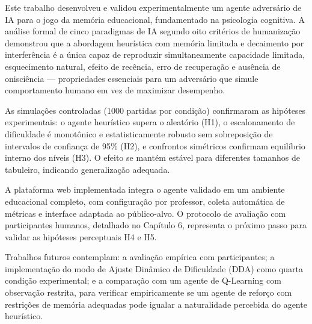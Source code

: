\documentclass[
    12pt,
    openright,
    twoside,
    a4paper,
    english,
    brazil
]{abntex2}
\begin{document}
Este trabalho desenvolveu e validou experimentalmente um agente adversário de IA para o jogo da memória educacional, fundamentado na psicologia cognitiva. A análise formal de cinco paradigmas de IA segundo oito critérios de humanização demonstrou que a abordagem heurística com memória limitada e decaimento por interferência é a única capaz de reproduzir simultaneamente capacidade limitada, esquecimento natural, efeito de recência, erro de recuperação e ausência de onisciência — propriedades essenciais para um adversário que simule comportamento humano em vez de maximizar desempenho.

As simulações controladas (1000 partidas por condição) confirmaram as hipóteses experimentais: o agente heurístico supera o aleatório (H1), o escalonamento de dificuldade é monotônico e estatisticamente robusto sem sobreposição de intervalos de confiança de 95\% (H2), e confrontos simétricos confirmam equilíbrio interno dos níveis (H3). O efeito se mantém estável para diferentes tamanhos de tabuleiro, indicando generalização adequada.

A plataforma web implementada integra o agente validado em um ambiente educacional completo, com configuração por professor, coleta automática de métricas e interface adaptada ao público-alvo. O protocolo de avaliação com participantes humanos, detalhado no Capítulo 6, representa o próximo passo para validar as hipóteses perceptuais H4 e H5.

Trabalhos futuros contemplam: a avaliação empírica com participantes; a implementação do modo de Ajuste Dinâmico de Dificuldade (DDA) como quarta condição experimental; e a comparação com um agente de Q-Learning com observação restrita, para verificar empiricamente se um agente de reforço com restrições de memória adequadas pode igualar a naturalidade percebida do agente heurístico.

\postextual

\end{document}
